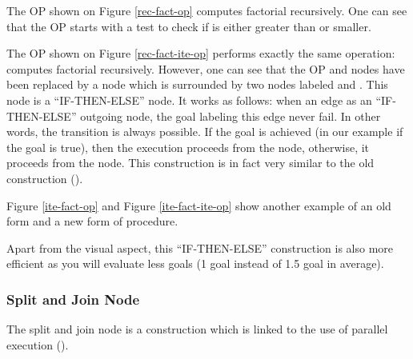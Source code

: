 The OP shown on Figure \ref{rec-fact-op} computes factorial recursively.
One can see that the OP starts with a test to check if  is either
greater than  or smaller.


The OP shown on Figure \ref{rec-fact-ite-op} performs exactly the same
operation: computes factorial recursively. However, one can see that the OP
 and  nodes have been replaced by a  node which is
surrounded by two nodes labeled  and . This node  is
a ``IF-THEN-ELSE'' node. It works as follows: when an edge as an
``IF-THEN-ELSE'' outgoing node, the goal labeling this edge never fail. In
other words, the transition is always possible. If the goal is achieved (in our
example if the goal  is true), then the execution proceeds
from the  node, otherwise, it proceeds from the  node. This
construction is in fact very similar to the old  construction
().



Figure \ref{ite-fact-op} and Figure \ref{ite-fact-ite-op} show another example
of an old form and a new form of procedure.

Apart from the visual aspect, this ``IF-THEN-ELSE'' construction is also more
efficient as you will evaluate less goals (1 goal instead of 1.5 goal in average).

\subsubsection{Split and Join Node}

The split and join node is a construction which is linked to the use of
parallel execution ().



